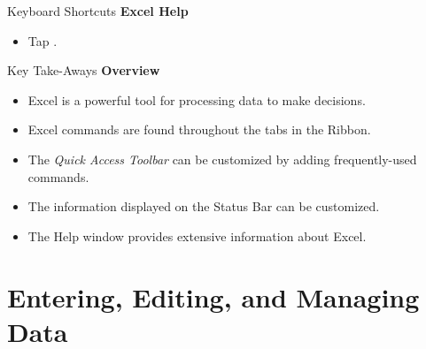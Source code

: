 \begin{center}
	\begin{shtcutbox}{Keyboard Shortcuts}
		\textbf{Excel Help}
		\\
		\begin{itemize}
			\setlength{\itemsep}{0pt}
			\setlength{\parskip}{0pt}
			\setlength{\parsep}{0pt}
			
			\item Tap .
			
		\end{itemize}
	\end{shtcutbox}
\end{center}


\begin{center}
	\begin{tkwbox}{Key Take-Aways}
		\textbf{Overview}
		\\
		\begin{itemize}
			\setlength{\itemsep}{0pt}
			\setlength{\parskip}{0pt}
			\setlength{\parsep}{0pt}
			
			\item Excel is a powerful tool for processing data to make decisions.
			\item Excel commands are found throughout the tabs in the Ribbon.
			\item The \textit{Quick Access Toolbar} can be customized by adding frequently-used commands.
			\item The information displayed on the Status Bar can be customized.
			\item The Help window provides extensive information about Excel.
			
		\end{itemize}
	\end{tkwbox}
\end{center}

\section{Entering, Editing, and Managing Data}

